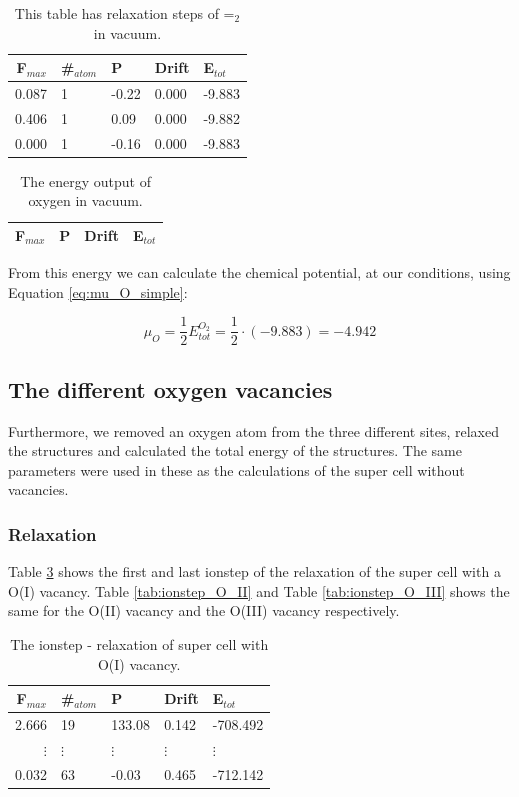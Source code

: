 \begin{table}[H]\caption{This table has relaxation steps of =$_2$ in vacuum.}\label{tab:oxygen_relax}
\begin{tabular}{rllll}
F$_{max}$ &\#$_{atom}$&	P&	Drift&	E$_{tot}$\\ \hline
0.087&	1&	-0.22&	0.000&	-9.883\\
0.406&	1&	0.09&	0.000&	-9.882\\
0.000&	1&	-0.16&	0.000&	-9.883\\
\end{tabular}
\end{table}

\begin{table}[H]\caption{The energy output of oxygen in vacuum.}\label{tab:oxygen_vacuum}
\begin{tabular}{llll}
F$_{max}$ &	P&	Drift&	E$_{tot}$ \\ \hline

\end{tabular}
\end{table}

From this energy we can calculate the chemical potential, at our conditions, using Equation \ref{eq:mu_O_simple}:

$$ \mu_O = \frac{1}{2}E_{tot}^{O_2} = \frac{1}{2}\cdot(-9.883) = -4.942 $$

\subsection{The different oxygen vacancies}

Furthermore, we removed an oxygen atom from the three different sites, relaxed the structures and calculated the total energy of the structures. The same parameters were used in these as the calculations of the super cell without vacancies.

\subsubsection{Relaxation}

Table \ref{tab:ionstep_O_I} shows the first and last ionstep of the relaxation of the super cell with a O(I) vacancy. Table \ref{tab:ionstep_O_II} and Table \ref{tab:ionstep_O_III} shows the same for the O(II) vacancy and the O(III) vacancy respectively.

\begin{table}[H]\caption{The ionstep - relaxation of super cell with O(I) vacancy.}\label{tab:ionstep_O_I}
\begin{tabular}{rllll}
F$_{max}$ &\#$_{atom}$&	P&	Drift&	E$_{tot}$\\ \hline
2.666&	19&	133.08&	0.142&	-708.492\\
$\vdots$&$\vdots$&$\vdots$&$\vdots$&$\vdots$\\
0.032&	63&	-0.03&	0.465&	-712.142\\
\end{tabular}
\end{table}

